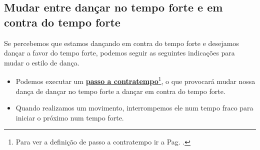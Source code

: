 \subsection{Mudar entre dançar no tempo forte e em contra do tempo forte}
Se percebemos  que estamos dançando em contra do tempo forte e desejamos dançar a favor do tempo forte,
podemos seguir as seguintes indicações para mudar o estilo de dança.
\begin{itemize}
\item Podemos executar um \hyperref[def:PassoAContratempo]{\textbf{passo a contratempo}}\footnote{ Para 
ver a definição de passo a contratempo ir a Pag. \pageref{def:PassoAContratempo}.},
o que provocará mudar nossa dança de dançar no tempo forte a dançar em contra do tempo forte.
\begin{example}
\end{example}
\item Quando realizamos um movimento, interrompemos ele num tempo fraco 
para iniciar o próximo num tempo forte.
\begin{example}
\end{example}
\end{itemize}




